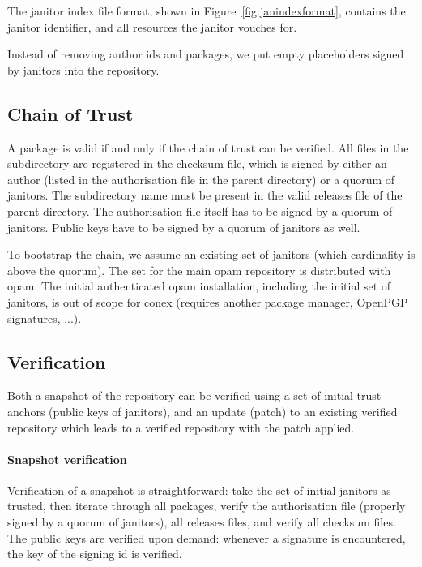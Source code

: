 \documentclass[nocopyrightspace]{sigplanconf}
\begin{document}
The janitor index file format, shown in Figure~\ref{fig:janindexformat}, contains the janitor identifier, and all resources the janitor vouches for.

Instead of removing author ids and packages, we put empty placeholders signed by janitors into the repository.

\subsection{Chain of Trust}
A package is valid if and only if the chain of trust can be verified.
All files in the subdirectory are registered in the checksum file, which is signed by either an author (listed in the authorisation file in the parent directory) or a quorum of janitors.
The subdirectory name must be present in the valid releases file of the parent directory.
The authorisation file itself has to be signed by a quorum of janitors.
Public keys have to be signed by a quorum of janitors as well.

To bootstrap the chain, we assume an existing set of janitors (which cardinality is above the quorum).
The set for the main opam repository is distributed with opam.
The initial authenticated opam installation, including the initial set of janitors, is out of scope for conex (requires another package manager, OpenPGP signatures, ...).

\subsection{Verification}
Both a snapshot of the repository can be verified using a set of initial trust anchors (public keys of janitors), and an update (patch) to an existing verified repository which leads to a verified repository with the patch applied.

\paragraph{Snapshot verification}  Verification of a snapshot is straightforward: take the set of initial janitors as trusted, then iterate through all packages, verify the authorisation file (properly signed by a quorum of janitors), all releases files, and verify all checksum files.
The public keys are verified upon demand: whenever a signature is encountered, the key of the signing id is verified.
\end{document}
